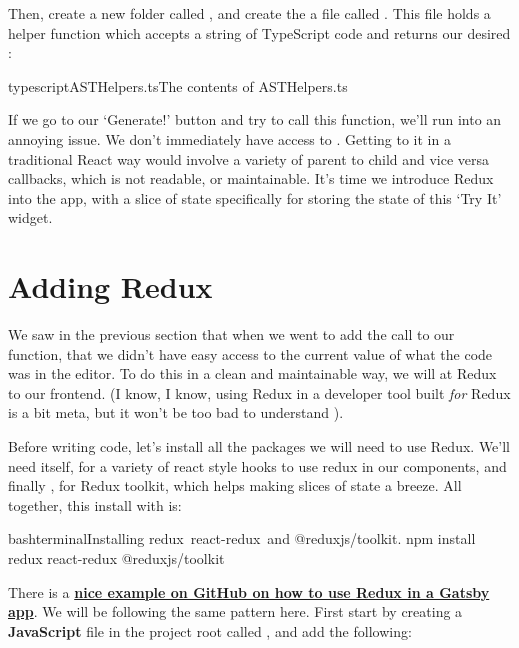 \documentclass[paper=6in:9in,pagesize=pdftex,headinclude=on,footinclude=on,12pt]{scrbook}
\makeatletter
\newcommand{\link}[2]{\textbf{\textcolor{monokaiPink}{\href{#2}{#1}}}}
\newcommand{\at}{\makeatletter @\makeatother}
\makeatother
\begin{document}
Then, create a new folder called , and create the a file called . This file holds a helper function  which accepts a string of TypeScript code and returns our desired :

\begin{codeInput}{typescript}{ASTHelpers.ts}{The contents of ASTHelpers.ts}

\end{codeInput}

If we go to our `Generate!' button and try to call this function, we'll run into an annoying issue. We don't immediately have access to . Getting to it in a traditional React way would involve a variety of parent to child and vice versa callbacks, which is not readable, or maintainable. It's time we introduce Redux into the app, with a slice of state specifically for storing the state of this `Try It' widget.

\section{Adding Redux}

We saw in the previous section that when we went to add the call to our  function, that we didn't have easy access to the current value of what the code was in the editor. To do this in a clean and maintainable way, we will at Redux to our frontend. (I know, I know, using Redux in a developer tool built \textit{for} Redux is a bit meta, but it won't be too bad to understand \wink). 


Before writing code, let's install all the packages we will need to use Redux. We'll need  itself,  for a variety of react style hooks to use redux in our components, and finally \index{\codeword{\at reduxjs/toolkit}}, for Redux toolkit, which helps making slices of state a breeze. All together, this install with  is:

\begin{codeInput}{bash}{terminal}{Installing redux\, react-redux\, and \at reduxjs/toolkit.}
npm install redux react-redux @reduxjs/toolkit
\end{codeInput}


There is a \link{nice example on GitHub on how to use Redux in a Gatsby app}{https://github.com/gatsbyjs/gatsby/tree/master/examples/using-redux}. We will be following the same pattern here. First start by creating a \textbf{JavaScript} file in the project root called , and add the following:
\end{document}
